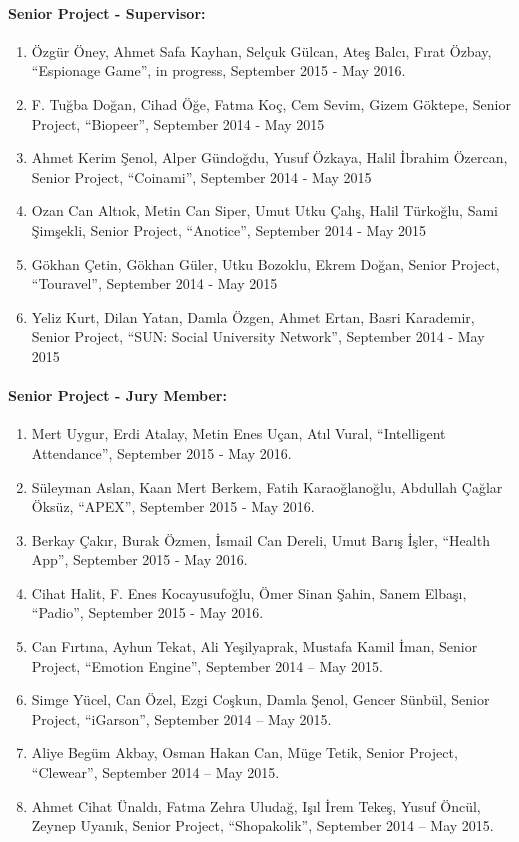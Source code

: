 \paragraph{Senior Project - Supervisor:}

\begin{enumerate} 
\item Özgür Öney, Ahmet Safa Kayhan, Selçuk Gülcan, Ateş Balcı, Fırat Özbay, ``Espionage Game'', in progress, September 2015 - May 2016.
\item F. Tuğba Doğan, Cihad Öğe, Fatma Koç, Cem Sevim, Gizem Göktepe, Senior Project, ``Biopeer'', September 2014 - May 2015
\item Ahmet Kerim Şenol, Alper Gündoğdu, Yusuf Özkaya, Halil İbrahim Özercan, Senior Project, ``Coinami'', September 2014 - May 2015
\item Ozan Can Altıok, Metin Can Siper, Umut Utku Çalış, Halil Türkoğlu, Sami Şimşekli, Senior Project, ``Anotice'', September 2014 - May 2015
\item Gökhan Çetin, Gökhan Güler, Utku Bozoklu, Ekrem Doğan, Senior Project, ``Touravel'', September 2014 - May 2015
\item Yeliz Kurt, Dilan Yatan, Damla Özgen, Ahmet Ertan, Basri Karademir, Senior Project, ``SUN: Social University Network'', September 2014 - May 2015
\end{enumerate}

\paragraph{Senior Project - Jury Member:}

\begin{enumerate}
\item Mert Uygur, Erdi Atalay, Metin Enes Uçan, Atıl Vural, ``Intelligent Attendance'', September 2015 - May 2016.
\item Süleyman Aslan, Kaan Mert Berkem, Fatih Karaoğlanoğlu, Abdullah Çağlar Öksüz, ``APEX'', September 2015 - May 2016.
\item Berkay Çakır, Burak Özmen, İsmail Can Dereli, Umut Barış İşler, ``Health App'', September 2015 - May 2016.
\item Cihat Halit, F. Enes Kocayusufoğlu, Ömer Sinan Şahin, Sanem Elbaşı, ``Padio'', September 2015 - May 2016.
\item Can Fırtına, Ayhun Tekat, Ali Yeşilyaprak, Mustafa Kamil İman, Senior Project, ``Emotion Engine'', September 2014 – May 2015.
\item Simge Yücel, Can Özel, Ezgi Coşkun, Damla Şenol, Gencer Sünbül, Senior Project, ``iGarson'', September 2014 – May 2015.
\item Aliye Begüm Akbay, Osman Hakan Can, Müge Tetik, Senior Project, ``Clewear'', September 2014 – May 2015.
\item Ahmet Cihat Ünaldı, Fatma Zehra Uludağ, Işıl İrem Tekeş, Yusuf Öncül, Zeynep Uyanık, Senior Project, ``Shopakolik'', September 2014 – May 2015.
\end{enumerate}
